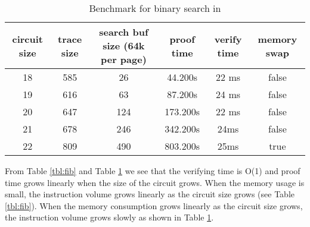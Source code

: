 \begin{table}[!h]
\small
\begin{center}
\caption{Benchmark for binary search in \zkwasm}
\label{tbl:bsearch}
\begin{tabular}{ | c | c | c | c | c | c | }
  \hline
  circuit size & trace size & search buf size (64k per page) & proof time & verify time & memory swap\\ 
  \hline
  18 & 585 & 26 & 44.200s & 22 ms & false\\
  \hline
    19 & 616 & 63 & 87.200s & 24 ms & false \\
  \hline
    20 & 647 & 124 & 173.200s & 22 ms & false \\
  \hline
    21 & 678 & 246 & 342.200s & 24ms & false\\
  \hline
    22 & 809 & 490 & 803.200s & 25ms & true \\
  \hline
\end{tabular}

\end{center}
\end{table}

From Table \ref{tbl:fib} and Table \ref{tbl:bsearch} we see that the verifying time is O(1) and proof time grows linearly when the size of the circuit grows. When the memory usage is small, the instruction volume grows linearly as the circuit size grows (see Table \ref{tbl:fib}). When the memory consumption grows linearly as the circuit size grows, the instruction volume grows slowly as shown in Table \ref{tbl:bsearch}.



